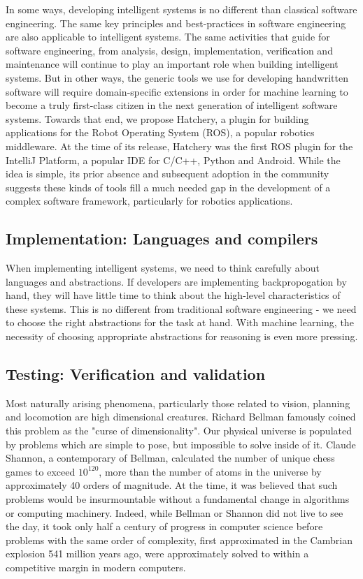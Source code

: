 \documentclass[12pt,initial,twoside,maitrise]{dms}
\numberwithin{equation}{section}
\numberwithin{table}{chapter}
\numberwithin{figure}{chapter}
\begin{document}
In some ways, developing intelligent systems is no different than classical software engineering. The same key principles and best-practices in software engineering are also applicable to intelligent systems. The same activities that guide for software engineering, from analysis, design, implementation, verification and maintenance will continue to play an important role when building intelligent systems. But in other ways, the generic tools we use for developing handwritten software will require domain-specific extensions in order for machine learning to become a truly first-class citizen in the next generation of intelligent software systems. Towards that end, we propose Hatchery, a plugin for building applications for the Robot Operating System (ROS), a popular robotics middleware. At the time of its release, Hatchery was the first ROS plugin for the IntelliJ Platform, a popular IDE for C/C++, Python and Android. While the idea is simple, its prior absence and subsequent adoption in the community suggests these kinds of tools fill a much needed gap in the development of a complex software framework, particularly for robotics applications.

\subsection{Implementation: Languages and compilers}

When implementing intelligent systems, we need to think carefully about languages and abstractions. If developers are implementing backpropogation by hand, they will have little time to think about the high-level characteristics of these systems. This is no different from traditional software engineering - we need to choose the right abstractions for the task at hand. With machine learning, the necessity of choosing appropriate abstractions for reasoning is even more pressing.

\subsection{Testing: Verification and validation}

Most naturally arising phenomena, particularly those related to vision, planning and locomotion are high dimensional creatures. Richard Bellman famously coined this problem as the "curse of dimensionality". Our physical universe is populated by problems which are simple to pose, but impossible to solve inside of it. Claude Shannon, a contemporary of Bellman, calculated the number of unique chess games to exceed $10^{120}$, more than the number of atoms in the universe by approximately 40 orders of magnitude\cite{shannon1950xxii}. At the time, it was believed that such problems would be insurmountable without a fundamental change in algorithms or computing machinery. Indeed, while Bellman or Shannon did not live to see the day, it took only half a century of progress in computer science before problems with the same order of complexity, first approximated in the Cambrian explosion 541 million years ago, were approximately solved to within a competitive margin in modern computers.
\end{document}

